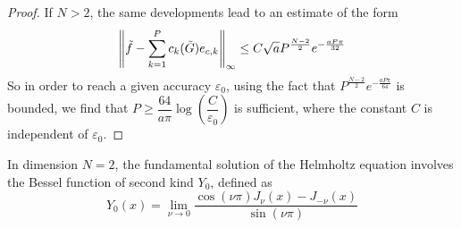 \documentclass[11pt,a4paper]{article}
\begin{document}
\begin{The}
\begin{proof}
If $N>2$, the same developments lead to an estimate of the form 
\[ \left\|\tilde{f} - \sum_{k=1}^{P}c_k(\tilde{G})e_{c,k}\right\|_{\infty} \leq C \sqrt{a} P^{\frac{N-2}{2}}e^{-\frac{aP\pi}{32}}\]
So in order to reach a given accuracy $\varepsilon_0$, using the fact that $P^{\frac{N-2}{2}}e^{-\frac{aP\pi}{64}}$ is bounded, we find that $P \geq \dfrac{64}{a\pi}\log\left(\dfrac{C}{\varepsilon_0}\right)$ is sufficient, where the constant $C$ is independent of $\varepsilon_0$. 
\end{proof}
\label{TheLaplace}
\end{The}

In dimension $N=2$, the fundamental solution of the Helmholtz equation involves the Bessel function of second kind $Y_0$, defined as 
\[Y_0(x) = \lim_{\nu\to0 } \dfrac{\cos(\nu\pi)J_{\nu}(x) - J_{-\nu}(x)}{\sin(\nu\pi)}\]
\end{document}
